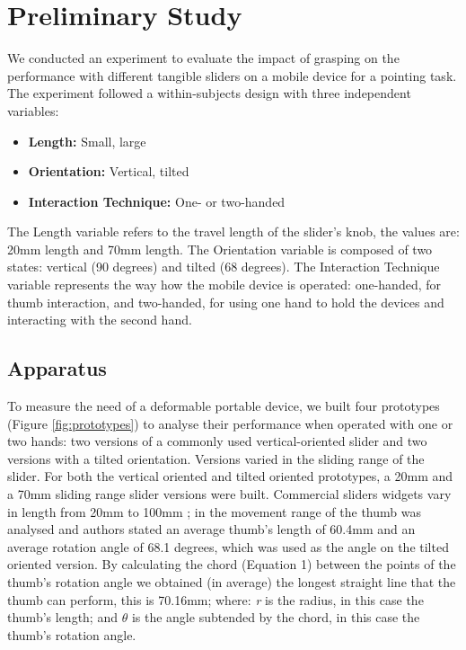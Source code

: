 \documentclass{sigchi}
\begin{document}
\section{Preliminary Study}
We conducted an experiment to evaluate the impact of grasping on the performance with different tangible sliders on a mobile device for a pointing task. The experiment followed a within-subjects design with three independent variables:

\begin{itemize}
\item \textbf{Length:} Small, large
\item \textbf{Orientation:} Vertical, tilted
\item \textbf{Interaction Technique:} One- or two-handed
\end{itemize}

The Length variable refers to the travel length of the slider’s knob, the values are: 20mm length and 70mm length. The Orientation variable is composed of two states: vertical (90 degrees) and tilted (68 degrees). The Interaction Technique variable represents the way how the mobile device is operated: one-handed, for thumb interaction, and two-handed, for using one hand to hold the devices and interacting with the second hand.
\subsection{Apparatus}
To measure the need of a deformable portable device, we built four prototypes (Figure \ref{fig:prototypes}) to analyse their performance when operated with one or two hands: two versions of a commonly used vertical-oriented slider and two versions with a tilted orientation. Versions varied in the sliding range of the slider. For both the vertical oriented and tilted oriented prototypes, a 20mm and a 70mm sliding range slider versions were built. Commercial sliders widgets vary in length from 20mm to 100mm \cite{Coutrix2015}; in \cite{Hirotaka:2003:RCC:765891.766081} the movement range of the thumb was analysed and authors stated an average thumb’s length of 60.4mm and an average rotation angle of 68.1 degrees, which was used as the angle on the tilted oriented version. By calculating the chord (Equation 1) between the points of the thumb’s rotation angle we obtained (in average) the longest straight line that the thumb can perform, this is 70.16mm; where: \textit{r} is the radius, in this case the thumb’s length; and $\theta$ is the angle subtended by the chord, in this case the thumb’s rotation angle.
\end{document}
